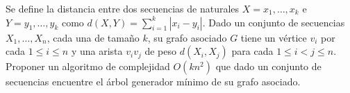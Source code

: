 
  \item\Obligatorio Se define la distancia entre dos secuencias de naturales $X = x_1, \ldots, x_k$ e $Y = y_1, \ldots, y_k$ como $d(X, Y) = \sum_{i=1}^k |x_i-y_i|$.  Dado un conjunto de secuencias $X_1, \ldots, X_n$, cada una de tamaño $k$, su grafo asociado $G$ tiene un vértice $v_i$ por cada $1 \leq i \leq n$ y una arista $v_iv_j$ de peso $d(X_i, X_j)$ para cada $1 \leq i < j \leq n$.  Proponer un algoritmo de complejidad $O(kn^2)$ que dado un conjunto de secuencias encuentre el árbol generador mínimo de su grafo asociado.



